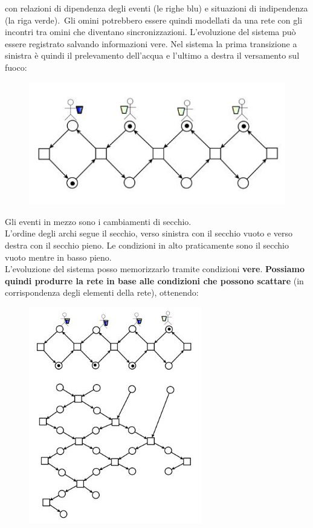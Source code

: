 con relazioni di dipendenza degli eventi (le righe blu) e situazioni di
indipendenza (la riga verde).\ 
Gli omini potrebbero essere quindi
modellati da una rete con gli incontri tra omini che diventano
sincronizzazioni. L'evoluzione del sistema può essere registrato salvando
informazioni vere. Nel sistema la prima transizione a sinistra è quindi il
prelevamento dell'acqua e l'ultimo a destra il versamento sul fuoco:
\begin{figure}[H]
  \centering
  \includegraphics[scale = 0.5]{img/inc.jpg} 
\end{figure}
Gli eventi in mezzo sono i cambiamenti di secchio.\\
L'ordine degli archi segue il secchio, verso sinistra con il secchio vuoto e
verso destra con il secchio pieno. Le condizioni in alto praticamente sono il
secchio vuoto mentre in basso pieno.\\
L'evoluzione del sistema posso memorizzarlo tramite condizioni \textbf{vere}. 
\textbf{Possiamo quindi produrre la rete in base alle condizioni che possono scattare}
(in corrispondenza degli elementi della rete),
ottenendo:
\begin{figure}[H]
  \centering
  \includegraphics[scale = 0.7]{img/inc2.jpg} 
\end{figure}
